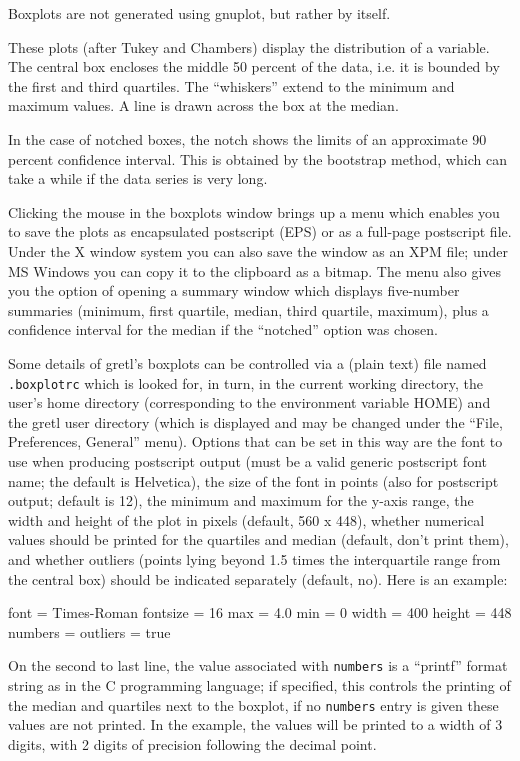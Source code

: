 Boxplots are not generated using gnuplot, but rather by 
itself.

These plots (after Tukey and Chambers) display the distribution
of a variable. The central box encloses the middle 50 percent of the
data, i.e. it is bounded by the first and third quartiles.  The
``whiskers'' extend to the minimum and maximum values.  A line is
drawn across the box at the median.

In the case of notched boxes, the notch shows the limits of an
approximate 90 percent confidence interval.  This is obtained by the
bootstrap method, which can take a while if the data series is very
long.

Clicking the mouse in the boxplots window brings up a menu which
enables you to save the plots as encapsulated postscript (EPS) or as a
full-page postscript file.  Under the X window system you can also
save the window as an XPM file; under MS Windows you can copy it to
the clipboard as a bitmap.  The menu also gives you the option of
opening a summary window which displays five-number summaries
(minimum, first quartile, median, third quartile, maximum), plus a
confidence interval for the median if the ``notched'' option was
chosen.  

Some details of gretl's boxplots can be controlled via a (plain text)
file named \verb+.boxplotrc+ which is looked for, in turn, in the
current working directory, the user's home directory (corresponding to
the environment variable HOME) and the gretl user directory (which is
displayed and may be changed under the ``File, Preferences, General''
menu).  Options that can be set in this way are the font to use when
producing postscript output (must be a valid generic postscript font
name; the default is Helvetica), the size of the font in points (also
for postscript output; default is 12), the minimum and maximum for the
y-axis range, the width and height of the plot in pixels (default, 560
x 448), whether numerical values should be printed for the quartiles
and median (default, don't print them), and whether outliers (points
lying beyond 1.5 times the interquartile range from the central box)
should be indicated separately (default, no).  Here is an example:

\begin{code}
    font = Times-Roman
    fontsize = 16
    max = 4.0
    min = 0
    width = 400
    height = 448
    numbers = %
    outliers = true
\end{code}

On the second to last line, the value associated with \verb+numbers+
is a ``printf'' format string as in the C programming language; if
specified, this controls the printing of the median and quartiles next
to the boxplot, if no \verb+numbers+ entry is given these values are
not printed.  In the example, the values will be printed to a width of
3 digits, with 2 digits of precision following the decimal point.

